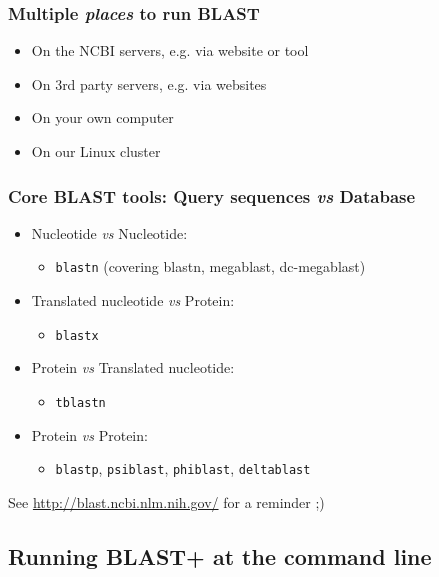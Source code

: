 \documentclass[table]{beamer}
\begin{document}
    \begin{frame}
     \frametitle{Multiple \textit{places} to run BLAST}
     \begin{itemize}
       \item On the NCBI servers, e.g. via website or tool
       \item On 3rd party servers, e.g. via websites
       \item On your own computer
       \item On our Linux cluster
     \end{itemize}
    \end{frame}

    \begin{frame}
     \frametitle{Core BLAST tools: Query sequences \textit{vs} Database}
     \begin{itemize}
       \item Nucleotide \textit{vs} Nucleotide:
           \begin{itemize}\item \texttt{blastn} (covering blastn, megablast, dc-megablast) \end{itemize}
       \item Translated nucleotide \textit{vs} Protein:
           \begin{itemize}\item \texttt{blastx} \end{itemize}
       \item Protein \textit{vs} Translated nucleotide:
           \begin{itemize}\item \texttt{tblastn} \end{itemize}
       \item Protein \textit{vs} Protein:
           \begin{itemize}\item \texttt{blastp}, \texttt{psiblast}, \texttt{phiblast}, \texttt{deltablast} \end{itemize}
     \end{itemize}
     See \url{http://blast.ncbi.nlm.nih.gov/} for a reminder ;)
    \end{frame}

\subsection{Running BLAST+ at the command line}
\end{document}
